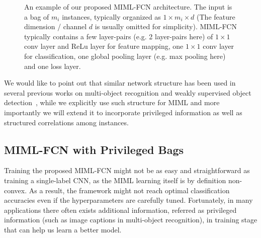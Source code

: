 \documentclass[10pt,twocolumn,letterpaper]{article}
\begin{document}
\begin{figure}
	\caption{An example of our proposed MIML-FCN architecture. The input is a bag of $m_i$ instances, typically organized as $1\times m_i\times d$ (The feature dimension / channel $d$ is usually omitted for simplicity). MIML-FCN typically contains a few layer-pairs (e.g. 2 layer-pairs here) of $1\times 1$ conv layer and ReLu layer for feature mapping, one $1\times 1$ conv layer for classification, one global pooling layer (e.g. max pooling here) and one loss layer.}
	\label{example-fcn}
\end{figure}

We would like to point out that similar network structure has been
used in several previous works on multi-object recognition and
weakly supervised object detection~\cite{Oquab2014,Bilen2016},
while we explicitly use such structure for MIML and more
importantly we will extend it to incorporate privileged
information as well as structured correlations among instances.



\subsection{MIML-FCN with Privileged Bags}
\label{FCN+} Training the proposed MIML-FCN might not be as easy
and straightforward as training a single-label CNN, as the MIML
learning itself is by definition non-convex. As a result, the
framework might not reach optimal classification accuracies even
if the hyperparameters are carefully tuned. Fortunately, in many
applications there often exists additional information, referred
as privileged information (such as image captions in multi-object
recognition), in training stage that can help us learn a better
model.
\end{document}
